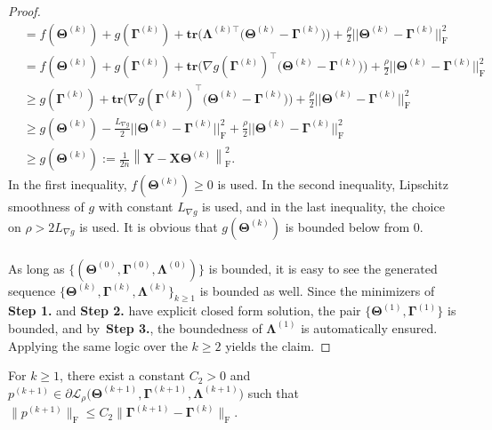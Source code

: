 \documentclass[alpha-refs]{wiley-article}
\begin{document}
\begin{proof}
\begin{align*}
    &= f(\boldsymbol{\Theta}^{(k)}) + g(\boldsymbol{\Gamma}^{(k)}) + \textbf{tr}\big( \boldsymbol{\Lambda}^{(k)\top}\big( \boldsymbol{\Theta}^{(k)} - \boldsymbol{\Gamma}^{(k)} \big)\big)
    + \frac{\rho}{2} || \boldsymbol{\Theta}^{(k)}-\boldsymbol{\Gamma}^{(k)} ||_{\text{F}}^{2} \\
    &= f(\boldsymbol{\Theta}^{(k)}) + g(\boldsymbol{\Gamma}^{(k)}) + \textbf{tr}\big( \nabla g(\boldsymbol{\Gamma}^{(k)})^\top\big( \boldsymbol{\Theta}^{(k)} - \boldsymbol{\Gamma}^{(k)} \big)\big)
    + \frac{\rho}{2} || \boldsymbol{\Theta}^{(k)}-\boldsymbol{\Gamma}^{(k)} ||_{\text{F}}^{2} \\
    &\geq g(\boldsymbol{\Gamma}^{(k)}) + \textbf{tr}\big( \nabla g(\boldsymbol{\Gamma}^{(k)})^\top\big( \boldsymbol{\Theta}^{(k)} - \boldsymbol{\Gamma}^{(k)} \big)\big)
    + \frac{\rho}{2} || \boldsymbol{\Theta}^{(k)}-\boldsymbol{\Gamma}^{(k)} ||_{\text{F}}^{2} \\
    &\geq g(\boldsymbol{\Theta}^{(k)}) -\frac{L_{\nabla g}}{2}|| \boldsymbol{\Theta}^{(k)}-\boldsymbol{\Gamma}^{(k)} ||_{\text{F}}^{2} + \frac{\rho}{2} || \boldsymbol{\Theta}^{(k)}-\boldsymbol{\Gamma}^{(k)} ||_{\text{F}}^{2} \\
    &\geq g(\boldsymbol{\Theta}^{(k)})
    :=\frac{1}{2n}\left\|\boldsymbol{Y}-\boldsymbol{X\Theta}^{(k)}\right\|_{\text{F}}^{2}.
\end{align*}
In the first inequality, $f(\boldsymbol{\Theta}^{(k)}) \geq 0$ is used.
In the second inequality, Lipschitz smoothness of $g$ with constant $L_{\nabla g}$ is used, and in the last inequality, the choice on $\rho>2L_{\nabla g}$ is used.
It is obvious that $g(\boldsymbol{\Theta}^{(k)})$ is bounded below from $0$.
\\ \\
As long as $\{(\boldsymbol{\Theta}^{(0)},\boldsymbol{\Gamma}^{(0)},\boldsymbol{\Lambda}^{(0)})\}$ is bounded, it is easy to see the generated sequence $\{\boldsymbol{\Theta}^{(k)},\boldsymbol{\Gamma}^{(k)},\boldsymbol{\Lambda}^{(k)}\}_{k \geq 1}$ is bounded as well.
Since the minimizers of \textbf{Step 1.} and \textbf{Step 2.} have explicit closed form solution, the pair $\{\boldsymbol{\Theta}^{(1)},\boldsymbol{\Gamma}^{(1)}\}$ is bounded, and by~\textbf{Step 3.}, the boundedness of $\boldsymbol{\Lambda}^{(1)}$ is automatically ensured.
Applying the same logic over the $k \geq 2$ yields the claim.
\end{proof}

\newpage
\begin{lemma} \label{Lemma2.4}
For $k\geq 1$, there exist a constant $C_{2}>0$ and $p^{(k+1)}\in\partial \mathcal{L}_{\rho} \big( \boldsymbol{\Theta}^{(k+1)},\boldsymbol{\Gamma}^{(k+1)},\boldsymbol{\Lambda}^{(k+1)} \big)$ such that $\|p^{(k+1)}\|_{\text{F}}\leq C_{2} \| \boldsymbol{\Gamma}^{(k+1)} - \boldsymbol{\Gamma}^{(k)} \|_{\text{F}}$.
\end{lemma}
\end{document}
